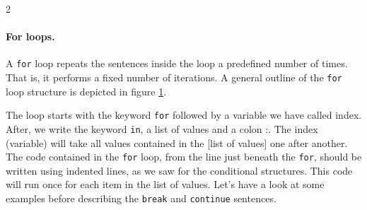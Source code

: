 \begin{paracol}{2}
\paragraph{For loops.}  A \texttt{for} loop repeats the sentences inside the loop a predefined number of times. That is, it performs a fixed number of iterations. A general outline of the \texttt{for} loop structure is depicted in figure \ref{fig:for}.

The loop starts with the keyword \texttt{for} followed by a variable we have called
index. After, we write the keyword \texttt{in}, a list of values and a colon :. The index (variable) will take all values contained in the [list of values] one after another. The code contained in the \texttt{for} loop, from the line just beneath the \texttt{for}, should be written using indented lines, as we saw for the conditional structures. This code will run once for each item in the list of values. Let's have a look at some examples before describing the \texttt{break} and \texttt{continue} sentences.  
\end{paracol}
\begin{figure}
\centering
{}
\label{fig:for}
\end{figure} 


